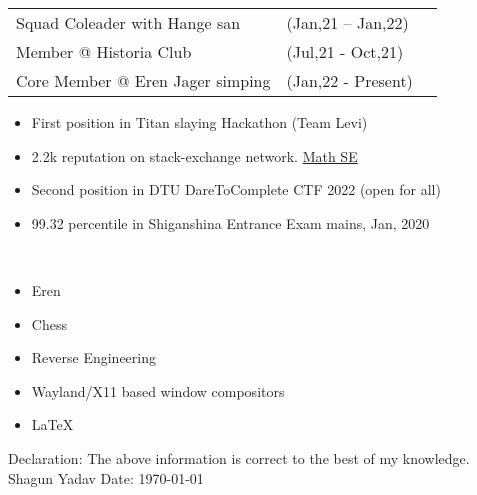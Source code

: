 \documentclass[10pt]{extarticle}
\newcommand{\yourname}{Shagun Yadav}%
\begin{document}
\vspace{0pt}
\begin{contained}
\begin{longtable}{p{}p{}p{}}
    Squad Coleader with Hange san & (Jan,21 – Jan,22)\\
    Member @ Historia Club & (Jul,21 - Oct,21)\\
    Core Member @ Eren Jager simping & (Jan,22 - Present)\\
\end{longtable}
\vspace{0pt}
\end{contained}
\begin{contained}
\vspace{0pt}
\begin{itemize}
    \setlength\itemsep{0.5pt}
    \item First position in Titan slaying Hackathon (Team Levi)
    \item 2.2k reputation on stack-exchange network. \href{https://math.stackexchange.com/users/811225}{\color{red!70} Math SE}
    \item Second position in DTU DareToComplete CTF 2022 (open for all)
    \item 99.32 percentile in Shiganshina Entrance Exam mains, Jan, 2020
\end{itemize}
\vspace{0pt}
\end{contained}
\begin{contained}\\
\begin{itemize}
    \setlength\itemsep{0.5pt}
    \item Eren
    \item Chess
    \item Reverse Engineering
    \item Wayland/X11 based window compositors
    \item \LaTeX
\end{itemize}
\end{contained}
Declaration: The above information is correct to the best of my knowledge.\newline
\yourname\newline
Date: \today
\end{document}
